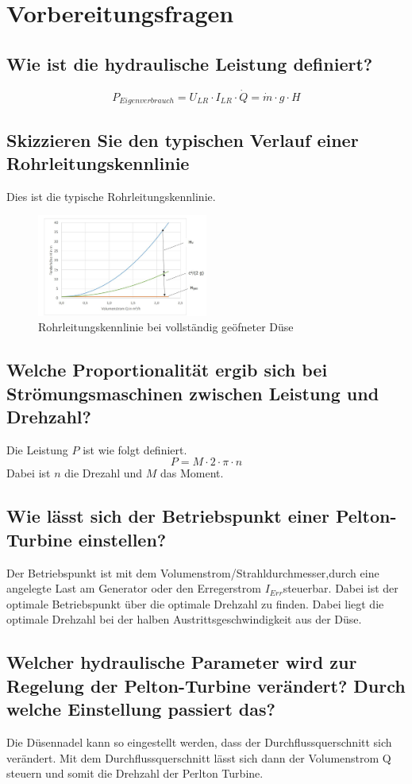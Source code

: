 \section{Vorbereitungsfragen}
\subsection{Wie ist die hydraulische Leistung definiert?}
%
\begin{equation}
	P_{ Eigenverbrauch }= U_{ LR} \cdot I_{ LR }\cdot \dot Q = \dot m \cdot g \cdot H
\label{eq:2}
\end{equation}
%
\subsection{Skizzieren Sie den typischen Verlauf einer Rohrleitungskennlinie}
Dies ist die typische Rohrleitungskennlinie.
%
\begin{figure}[!ht]
		\centering
		\includegraphics[width=0.5\textwidth]{Abbildungen/Rohrleitungskennlinie}
		\caption{Rohrleitungskennlinie bei vollständig geöfneter Düse}
		\label{fig:230512_Rohrleitungskennlinie}
\end{figure}
%
\subsection{Welche Proportionalität ergib sich bei Strömungsmaschinen zwischen Leistung und Drehzahl?}
Die Leistung $P$ ist wie folgt definiert.
%
\begin{equation}
	P= M \cdot 2 \cdot \pi \cdot n
\label{eq:230512_MechanischeLeistung}
\end{equation}
%
Dabei ist $n$ die Drezahl und $M$ das Moment.
\subsection{Wie lässt sich der Betriebspunkt einer Pelton-Turbine einstellen?}
Der Betriebspunkt ist mit dem Volumenstrom/Strahldurchmesser,durch eine angelegte Last am Generator oder den Erregerstrom $I_{Err}$steuerbar. Dabei ist der optimale Betriebspunkt über die optimale Drehzahl zu finden. Dabei liegt die optimale Drehzahl bei der halben Austrittsgeschwindigkeit aus der Düse.

\subsection{Welcher hydraulische Parameter wird zur Regelung der Pelton-Turbine verändert?
Durch welche Einstellung passiert das?}
Die Düsennadel kann so eingestellt werden, dass der Durchflussquerschnitt sich verändert. Mit dem Durchflussquerschnitt lässt sich dann der Volumenstrom Q steuern und somit die Drehzahl der Perlton Turbine.